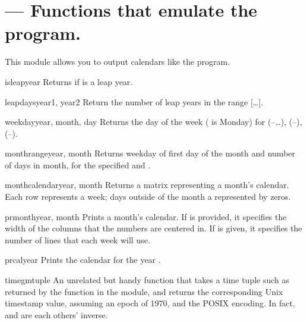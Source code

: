 
\section{ ---
         Functions that emulate the \UNIX{}  program.}



This module allows you to output calendars like the \UNIX{}
 program.

\begin{funcdesc}{isleap}{year}
Returns  if  is a leap year.
\end{funcdesc}

\begin{funcdesc}{leapdays}{year1, year2}
Return the number of leap years in the range
[\ldots{}].
\end{funcdesc}

\begin{funcdesc}{weekday}{year, month, day}
Returns the day of the week ( is Monday) for 
(--\ldots),  (--), 
(--).
\end{funcdesc}

\begin{funcdesc}{monthrange}{year, month}
Returns weekday of first day of the month and number of days in month, 
for the specified  and .
\end{funcdesc}

\begin{funcdesc}{monthcalendar}{year, month}
Returns a matrix representing a month's calendar.  Each row represents
a week; days outside of the month a represented by zeros.
\end{funcdesc}

\begin{funcdesc}{prmonth}{year, month}
Prints a month's calendar.  If  is provided, it specifies
the width of the columns that the numbers are centered in.  If
 is given, it specifies the number of lines that each
week will use.
\end{funcdesc}

\begin{funcdesc}{prcal}{year}
Prints the calendar for the year .
\end{funcdesc}

\begin{funcdesc}{timegm}{tuple}
An unrelated but handy function that takes a time tuple such as
returned by the  function in the 
module, and returns the corresponding Unix timestamp value, assuming
an epoch of 1970, and the POSIX encoding.  In fact,
 and  are each others' inverse.
\end{funcdesc}
